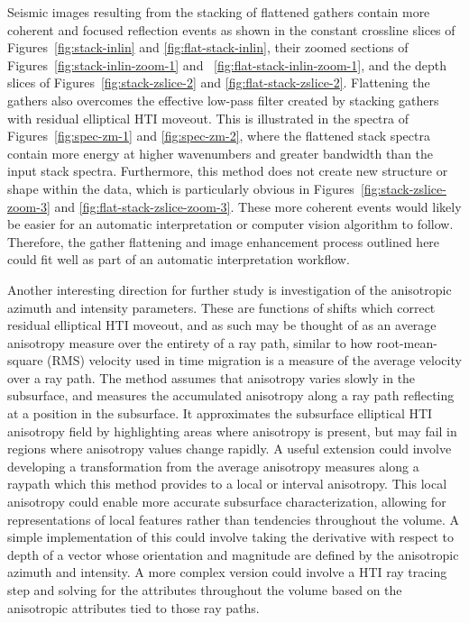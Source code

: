 Seismic images resulting from the stacking of flattened gathers contain more coherent and focused reflection events as shown in the constant crossline slices of Figures~\ref{fig:stack-inlin} and \ref{fig:flat-stack-inlin}, their zoomed sections of Figures~\ref{fig:stack-inlin-zoom-1} and ~\ref{fig:flat-stack-inlin-zoom-1}, and the depth slices of Figures~\ref{fig:stack-zslice-2} and \ref{fig:flat-stack-zslice-2}. Flattening the gathers also overcomes the effective low-pass filter created by stacking gathers with residual elliptical HTI moveout.  This is illustrated in the spectra of Figures~\ref{fig:spec-zm-1} and \ref{fig:spec-zm-2}, where the flattened stack spectra contain more energy at higher wavenumbers and greater bandwidth than the input stack spectra. Furthermore, this method does not create new structure or shape within the data, which is particularly obvious in Figures~\ref{fig:stack-zslice-zoom-3} and \ref{fig:flat-stack-zslice-zoom-3}.  These more coherent events would likely be easier for an automatic interpretation or computer vision algorithm to follow.  Therefore, the gather flattening and image enhancement process outlined here could fit well as part of an automatic interpretation workflow.

Another interesting direction for further study is investigation of the  anisotropic azimuth and intensity parameters.  These are functions of shifts which correct residual elliptical HTI moveout, and as such may be thought of as an average anisotropy measure over the entirety of a ray path, similar to how root-mean-square (RMS) velocity used in time migration is a measure of the average velocity over a ray path. The method assumes that anisotropy varies slowly in the subsurface, and measures the accumulated anisotropy along a ray path reflecting at a position in the subsurface.  It approximates the subsurface elliptical HTI anisotropy field by highlighting areas where anisotropy is present, but may fail in regions where anisotropy values change rapidly.  A useful extension could involve developing a transformation from the average anisotropy measures along a raypath which this method provides to a local or interval anisotropy.  This local anisotropy could enable more accurate subsurface characterization, allowing for  representations of local features rather than tendencies throughout the volume.  A simple implementation of this could involve taking the derivative with respect to depth of a vector whose orientation and magnitude are defined by the anisotropic azimuth and intensity.  A more complex version could involve a HTI ray tracing step and solving for the attributes throughout the volume based on the anisotropic attributes tied to those ray paths.



